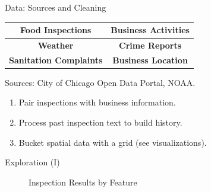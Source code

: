 \documentclass[final]{beamer}
\newlength{\onecolwid}
\begin{document}
\begin{frame}[t]
\begin{columns}[t]
\begin{column}{\onecolwid}
\begin{block}{Data: Sources and Cleaning}
\def\arraystretch{1.5}
\begin{tabular}{|c| c|}
\hline
\textbf{Food Inspections} & \textbf{Business Activities} \\ \hline
\textbf{Weather} & \textbf{Crime Reports} \\ \hline
\textbf{Sanitation Complaints} & \textbf{Business Location}\\ \hline
\end{tabular}\vspace{0.2in.}
Sources: City of Chicago Open Data Portal, NOAA. 

\begin{enumerate}
    \item Pair inspections with business information.
    \item Process past inspection text to build history.
    \item Bucket spatial data with a grid (see visualizations).
\end{enumerate}

\end{block}

\vspace{-1in.}
\begin{block}{Exploration (I)}
\begin{figure}[H]
  \centering

  \caption{Inspection Results by Feature}
\end{figure}
\end{block}



\end{column}
\end{columns}
\end{frame}
\end{document}
